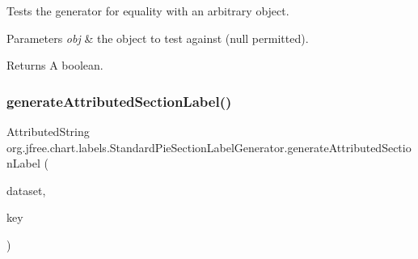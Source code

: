 Tests the generator for equality with an arbitrary object.


\begin{DoxyParams}{Parameters}
{\em obj} & the object to test against ({\ttfamily null} permitted).\\
\hline
\end{DoxyParams}
\begin{DoxyReturn}{Returns}
A boolean. 
\end{DoxyReturn}
\mbox{\label{classorg_1_1jfree_1_1chart_1_1labels_1_1_standard_pie_section_label_generator_a77c817699c799f3112e7ed696bae25d5}} 
\subsubsection{\texorpdfstring{generate\+Attributed\+Section\+Label()}{generateAttributedSectionLabel()}}
{\footnotesize\ttfamily Attributed\+String org.\+jfree.\+chart.\+labels.\+Standard\+Pie\+Section\+Label\+Generator.\+generate\+Attributed\+Section\+Label (\begin{DoxyParamCaption}\item[{\mbox{\hyperlink{interfaceorg_1_1jfree_1_1data_1_1general_1_1_pie_dataset}{Pie\+Dataset}}}]{dataset,  }\item[{Comparable}]{key }\end{DoxyParamCaption})}

